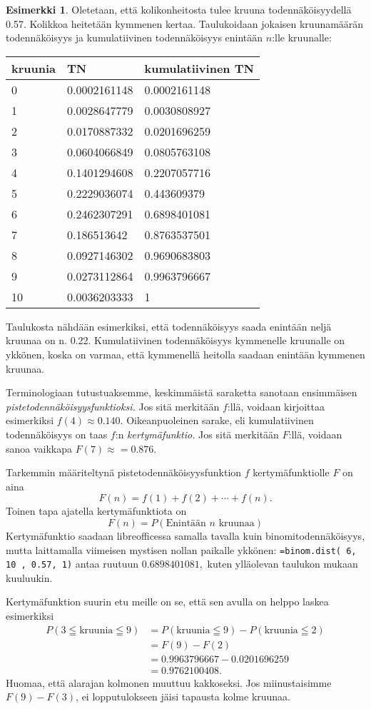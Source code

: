 \documentclass[12pt,leqno,a4paper,oneside]{amsart}
\theoremstyle{definition}
\newtheorem{example}[proclaim]{Esimerkki}
\theoremstyle{remark}
\numberwithin{equation}{section}
\begin{document}
\begin{example}
 Oletetaan, että kolikonheitosta tulee kruuna todennäköisyydellä 0.57. Kolikkoa heitetään kymmenen kertaa. Taulukoidaan jokaisen kruunamäärän todennäköisyys
 ja kumulatiivinen todennäköisyys enintään $n$:lle kruunalle:

 \begin{tabular}{l|l|l}
 kruunia &TN &kumulatiivinen TN\\
 \hline
0	&0.0002161148	&0.0002161148\\
1	&0.0028647779	&0.0030808927\\
2	&0.0170887332	&0.0201696259\\
3	&0.0604066849	&0.0805763108\\
4	&0.1401294608	&0.2207057716\\
5	&0.2229036074	&0.443609379\\
6	&0.2462307291	&0.6898401081\\
7	&0.186513642	&0.8763537501\\
8	&0.0927146302	&0.9690683803\\
9	&0.0273112864	&0.9963796667\\
10	&0.0036203333	&1\\
 \end{tabular}

Taulukosta nähdään esimerkiksi, että todennäköisyys saada enintään neljä kruunaa on n. 0.22. Kumulatiivinen todennäköisyys kymmenelle kruunalle on ykkönen,
koska on varmaa, että kymmenellä heitolla saadaan enintään kymmenen kruunaa.

Terminologiaan tutustuaksemme, keskimmäistä saraketta sanotaan ensimmäisen \emph{pistetodennäköisyysfunktioksi.} Jos sitä merkitään $f$:llä, voidaan kirjoittaa
esimerkiksi $f(4)\approx 0.140.$ Oikeanpuoleinen sarake, eli kumulatiivinen todennäköisyys on taas $f$:n \emph{kertymäfunktio.} Jos sitä merkitään
$F$:llä, voidaan sanoa vaikkapa $F(7)\approx = 0.876.$ 
\end{example}

Tarkemmin määriteltynä pistetodennäköisyysfunktion $f$ kertymäfunktiolle $F$ on aina
$$F(n) = f(1)+f(2)+\cdots + f(n).$$
Toinen tapa ajatella kertymäfunktiota on
$$F(n) = P ( \text{Enintään } n \text{ kruunaa}) $$
Kertymäfunktio saadaan libreofficessa samalla tavalla kuin binomitodennäköisyys, mutta laittamalla viimeisen mystisen nollan paikalle ykkönen:
\texttt{=binom.dist( 6, 10 , 0.57, 1)} antaa ruutuun $0.6898401081,$ kuten ylläolevan taulukon mukaan kuuluukin. 

Kertymäfunktion suurin etu meille on se, että sen avulla on helppo laskea esimerkiksi 
\begin{align*}
P(3 \leqq \text{kruunia} \leqq 9) &=P(\text{kruunia} \leqq 9) - P(\text{kruunia} \leqq 2)\\
&=F(9)-F(2)\\
&=0.9963796667-0.0201696259\\
&=0.9762100408.
\end{align*}
Huomaa, että alarajan kolmonen muuttuu kakkoseksi. Jos miinustaisimme $F(9)-F(3)$, ei lopputulokseen jäisi tapausta kolme kruunaa.
\end{document}
